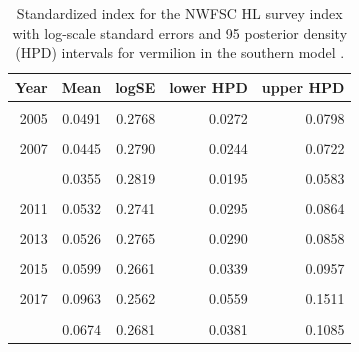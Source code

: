 \documentclass[11pt,
  english,
  a4paper,
]{article}
\begin{document}
\begin{table}

\caption{\label{tab:tab-index-nwfschl}Standardized index for the NWFSC HL survey index with log-scale standard errors and 95%
       posterior density (HPD) intervals for vermilion in the southern model .}
\centering
\begin{tabular}[t]{rrrrr}
\toprule
Year & Mean & logSE & lower HPD & upper HPD\\
\midrule
\cellcolor{gray!6}{2004} & \cellcolor{gray!6}{0.0403} & \cellcolor{gray!6}{0.2824} & \cellcolor{gray!6}{0.0222} & \cellcolor{gray!6}{0.0666}\\
2005 & 0.0491 & 0.2768 & 0.0272 & 0.0798\\
\cellcolor{gray!6}{2006} & \cellcolor{gray!6}{0.0438} & \cellcolor{gray!6}{0.2817} & \cellcolor{gray!6}{0.0239} & \cellcolor{gray!6}{0.0719}\\
2007 & 0.0445 & 0.2790 & 0.0244 & 0.0722\\
\cellcolor{gray!6}{2008} & \cellcolor{gray!6}{0.0266} & \cellcolor{gray!6}{0.2843} & \cellcolor{gray!6}{0.0145} & \cellcolor{gray!6}{0.0444}\\
\addlinespace
2009 & 0.0355 & 0.2819 & 0.0195 & 0.0583\\
\cellcolor{gray!6}{2010} & \cellcolor{gray!6}{0.0361} & \cellcolor{gray!6}{0.2825} & \cellcolor{gray!6}{0.0197} & \cellcolor{gray!6}{0.0599}\\
2011 & 0.0532 & 0.2741 & 0.0295 & 0.0864\\
\cellcolor{gray!6}{2012} & \cellcolor{gray!6}{0.0454} & \cellcolor{gray!6}{0.2756} & \cellcolor{gray!6}{0.0254} & \cellcolor{gray!6}{0.0739}\\
2013 & 0.0526 & 0.2765 & 0.0290 & 0.0858\\
\addlinespace
\cellcolor{gray!6}{2014} & \cellcolor{gray!6}{0.0578} & \cellcolor{gray!6}{0.2697} & \cellcolor{gray!6}{0.0326} & \cellcolor{gray!6}{0.0931}\\
2015 & 0.0599 & 0.2661 & 0.0339 & 0.0957\\
\cellcolor{gray!6}{2016} & \cellcolor{gray!6}{0.0586} & \cellcolor{gray!6}{0.2697} & \cellcolor{gray!6}{0.0329} & \cellcolor{gray!6}{0.0950}\\
2017 & 0.0963 & 0.2562 & 0.0559 & 0.1511\\
\cellcolor{gray!6}{2018} & \cellcolor{gray!6}{0.0879} & \cellcolor{gray!6}{0.2606} & \cellcolor{gray!6}{0.0501} & \cellcolor{gray!6}{0.1392}\\
\addlinespace
2019 & 0.0674 & 0.2681 & 0.0381 & 0.1085\\
\bottomrule
\end{tabular}
\end{table}
\end{document}
